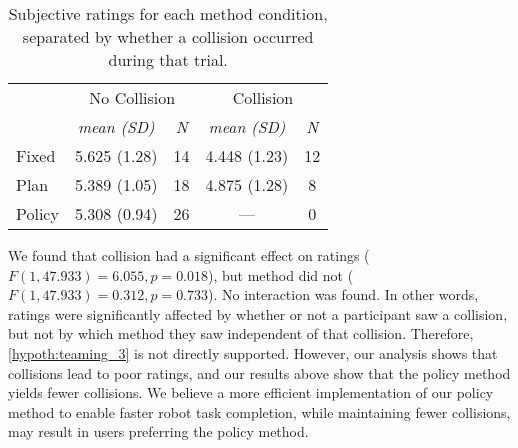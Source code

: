 \begin{table}
	\centering
	\begin{tabular}{lcccc}
		\toprule
		& \multicolumn{2}{c}{No Collision} & \multicolumn{2}{c}{Collision}\\
		\cmidrule(r){2-3} \cmidrule(l){4-5}
		& \emph{mean (SD)} & \emph{N} & \emph{mean (SD)} & \emph{N} \\ 
		\cmidrule(r){2-2}\cmidrule(lr){3-3}\cmidrule(lr){4-4} \cmidrule(l){5-5}
		Fixed 		&	5.625 (1.28)	& 14	& 4.448	(1.23)	& 12	\\
		Plan      & 	5.389 (1.05)	& 18	& 4.875	(1.28)	& 8		\\
		Policy 		&	5.308 (0.94)	& 26	& ---			& 0		\\
		\bottomrule
	\end{tabular}
	\caption{Subjective ratings for each method condition, separated by whether a collision occurred during that trial.}
	\label{tab:subjective}
\end{table}

We found that collision had a significant effect on ratings ($F(1,47.933)=6.055, p=0.018$), but method did not ($F(1,47.933)=0.312, p = 0.733$). No interaction was found. In other words, ratings were significantly affected by whether or not a participant saw a collision, but not by which method they saw independent of that collision. Therefore, \cref{hypoth:teaming_3} is not directly supported. However, our analysis shows that collisions lead to poor ratings, and our results above show that the policy method yields fewer collisions. We believe a more efficient implementation of our policy method to enable faster robot task completion, while maintaining fewer collisions, may result in users preferring the policy method.





